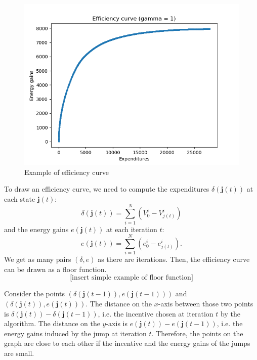 \documentclass[empty, english]{javaudin}
\begin{document}
\begin{figure}[h]
\begin{center}
	\includegraphics[scale=.7]{efficiency-curve.png}
\end{center}
\caption{Example of efficiency curve}
\label{fig:eff-curv}
\end{figure}

To draw an efficiency curve, we need to compute the expenditures $\delta(\mathbf{j}(t))$ at each state $\mathbf{j}(t)$:
\begin{equation}
	\delta(\mathbf{j}(t)) = \sum^{N}_{i=1} (V_0^i - V^i_{j(t)})
\end{equation}
and the energy gains $e(\mathbf{j}(t))$ at each iteration $t$:
\begin{equation}
	e(\mathbf{j}(t)) = \sum^{N}_{i=1} (e^i_0 - e^i_{j(t)}).
\end{equation}
We get as many pairs $(\delta, e)$ as there are iterations. Then, the efficiency curve can be drawn as a floor function.
\[ \text{[insert simple example of floor function]} \]

Consider the points $(\delta(\mathbf{j}(t-1)), e(\mathbf{j}(t-1)))$ and $(\delta(\mathbf{j}(t)), e(\mathbf{j}(t)))$.
The distance on the $x$-axis between those two points is $\delta(\mathbf{j}(t)) - \delta(\mathbf{j}(t-1))$, i.e. the incentive chosen at iteration $t$ by the algorithm.
The distance on the $y$-axis is $e(\mathbf{j}(t)) - e(\mathbf{j}(t-1))$, i.e. the energy gains induced by the jump at iteration $t$.
Therefore, the points on the graph are close to each other if the incentive and the energy gains of the jumps are small.
\end{document}
